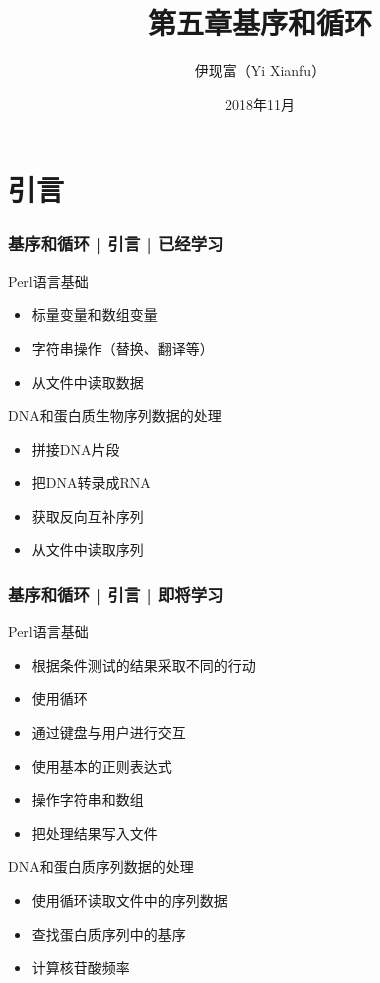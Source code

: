 


\title[基序和循环]{第五章\quad 基序和循环}
\author[Yixf]{伊现富（Yi Xianfu）}
\date{2018年11月}




\section{引言}
\begin{frame}
  \frametitle{基序和循环 | 引言 | 已经学习}
  \begin{block}{Perl语言基础}
    \begin{itemize}
      \item 标量变量和数组变量
      \item 字符串操作（替换、翻译等）
      \item 从文件中读取数据
    \end{itemize}
  \end{block}
  \pause
  \begin{block}{DNA和蛋白质生物序列数据的处理}
    \begin{itemize}
      \item 拼接DNA片段
      \item 把DNA转录成RNA
      \item 获取反向互补序列
      \item 从文件中读取序列
    \end{itemize}
  \end{block}
\end{frame}
\begin{frame}
  \frametitle{基序和循环 | 引言 | 即将学习}
  \begin{block}{Perl语言基础}
    \begin{itemize}
      \item 根据条件测试的结果采取不同的行动
      \item 使用循环
      \item 通过键盘与用户进行交互
      \item 使用基本的正则表达式
      \item 操作字符串和数组
      \item 把处理结果写入文件
    \end{itemize}
  \end{block}
  \pause
  \begin{block}{DNA和蛋白质序列数据的处理}
    \begin{itemize}
      \item 使用循环读取文件中的序列数据
      \item 查找蛋白质序列中的基序
      \item 计算核苷酸频率
    \end{itemize}
  \end{block}
\end{frame}


